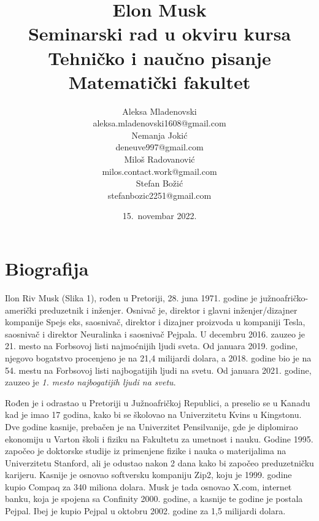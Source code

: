 \documentclass[a4paper,11pt]{article}
\begin{document}
\title{Elon Musk\\ \small{Seminarski rad u okviru kursa\\Tehničko i naučno pisanje\\ Matematički fakultet}}



\author{Aleksa Mladenovski\\ aleksa.mladenovski1608@gmail.com\\Nemanja Jokić\\ deneuve997@gmail.com\\ Miloš Radovanović\\ milos.contact.work@gmail.com\\ Stefan Božić\\ stefanbozic2251@gmail.com}
\date{15.~novembar 2022.}
\maketitle



\tableofcontents

\newpage




\section{Biografija}
\label{sec:Biografija}

Ilon Riv Musk (Slika 1), rođen u Pretoriji, 28. juna 1971. godine je južnoafričko-američki preduzetnik i inženjer. Osnivač je, direktor i glavni inženjer/dizajner kompanije Spejs eks, saosnivač, direktor i dizajner proizvoda u kompaniji Tesla, saosnivač i direktor Neuralinka i saosnivač Pejpala. U decembru 2016. zauzeo je 21. mesto na Forbsovoj listi najmoćnijih ljudi sveta. Od januara 2019. godine, njegovo bogatstvo procenjeno je na 21,4 milijardi dolara, a 2018. godine bio je na 54. mestu na Forbsovoj listi najbogatijih ljudi na svetu. Od januara 2021. godine, zauzeo je \emph{1. mesto najbogatijih ljudi na svetu}.

Rođen je i odrastao u Pretoriji u Južnoafričkoj Republici, a preselio se u Kanadu kad je imao 17 godina, kako bi se školovao na Univerzitetu Kvins u Kingstonu. Dve godine kasnije, prebačen je na Univerzitet Pensilvanije, gde je diplomirao ekonomiju u Varton školi i fiziku na Fakultetu za umetnost i nauku. Godine 1995. započeo je doktorske studije iz primenjene fizike i nauka o materijalima na Univerzitetu Stanford, ali je odustao nakon 2 dana kako bi započeo preduzetničku karijeru. Kasnije je osnovao softversku kompaniju Zip2, koju je 1999. godine kupio Compaq za 340 miliona dolara. Musk je tada osnovao X.com, internet banku, koja je spojena sa Confinity 2000. godine, a kasnije te godine je postala Pejpal. Ibej je kupio Pejpal u oktobru 2002. godine za 1,5 milijardi dolara.
\end{document}
